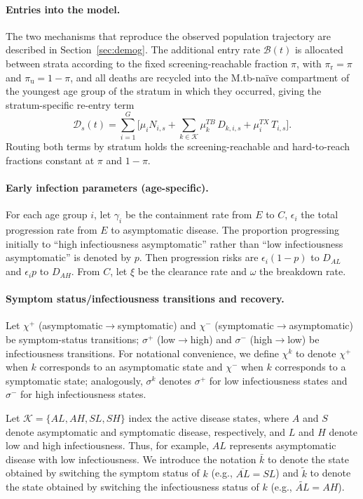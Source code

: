 \documentclass[11pt]{article}
\begin{document}
\paragraph{Entries into the model.}
The two mechanisms that reproduce the observed population trajectory are described in Section~\ref{sec:demog}. The additional entry rate \(\mathcal{B}(t)\) is allocated between strata according to the fixed screening-reachable fraction \(\pi\), with \(\pi_{\mathrm{r}}=\pi\) and \(\pi_{\mathrm{u}}=1-\pi\), and all deaths are recycled into the M.tb-na\"ive compartment of the youngest age group of the stratum in which they occurred, giving the stratum-specific re-entry term
\[
\mathcal{D}_s(t) =
\sum_{i=1}^{G}
\Bigg[
\mu_i N_{i,s}
+ \sum_{k\in\mathcal{K}} \mu^{TB}_{k}\, D_{k,i,s}
+ \mu^{TX}_i\, T_{i,s}
\Bigg].
\]
Routing both terms by stratum holds the screening-reachable and hard-to-reach fractions constant at \(\pi\) and \(1-\pi\).

\paragraph{Early infection parameters (age-specific).}
For each age group \(i\), let \(\gamma_i\) be the containment rate from \(E\) to \(C\), \(\epsilon_i\) the total progression rate from \(E\) to asymptomatic disease. The proportion progressing initially to ``high infectiousness asymptomatic'' rather than ``low infectiousness asymptomatic'' is denoted by \(p\). Then progression risks are \(\epsilon_i(1-p)\) to \(D_{AL}\) and \(\epsilon_i p\) to \(D_{AH}\). From \(C\), let \(\xi\) be the clearance rate and \(\omega\) the breakdown rate.

\paragraph{Symptom status/infectiousness transitions and recovery.}
Let \(\chi^+\) (asymptomatic\(\to\)symptomatic) and \(\chi^-\) (symptomatic\(\to\)asymptomatic) be symptom-status transitions; \(\sigma^+\) (low\(\to\)high) and \(\sigma^-\) (high\(\to\)low) be infectiousness transitions. 
For notational convenience, we define \(\chi^k\) to denote \(\chi^+\) when \(k\) corresponds to an asymptomatic state and \(\chi^-\) when \(k\) corresponds to a symptomatic state; analogously, \(\sigma^k\) denotes \(\sigma^+\) for low infectiousness states and \(\sigma^-\) for high infectiousness states.

Let \(\mathcal{K}=\{AL,AH,SL,SH\}\) index the active disease states, where \(A\) and \(S\) denote asymptomatic and symptomatic disease, respectively, and
\(L\) and \(H\) denote low and high infectiousness. Thus, for example, \(AL\) represents asymptomatic disease with low infectiousness.
We introduce the notation \(\bar{k}\) to denote the state obtained by switching the symptom status of \(k\) (e.g., \(\overline{AL} = SL\)) 
and \(\tilde{k}\) to denote the state obtained by switching the infectiousness status of \(k\) (e.g., \(\tilde{AL} = AH\)).
\end{document}
